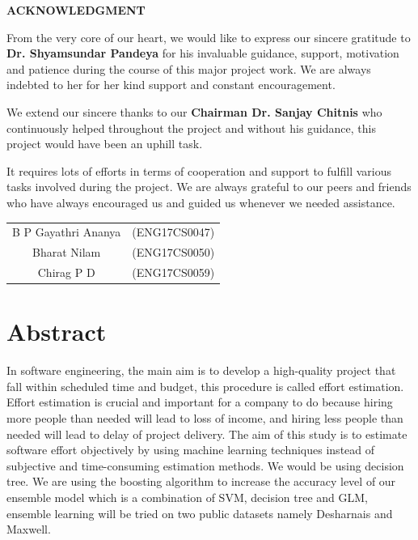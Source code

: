\documentclass[a4paper,12pt]{article}
\begin{document}
\begin{center}
    \large
    \textbf{ACKNOWLEDGMENT}
    
    \vspace{0.7cm}
    \normalsize
    \justify
    From the very core of our heart, we would like to express our sincere gratitude to \textbf{Dr. Shyamsundar Pandeya} for his invaluable guidance, support, motivation and patience during the
course of this major project work. We are always indebted to her for her kind support and constant encouragement.

We extend our sincere thanks to our \textbf{Chairman Dr. Sanjay Chitnis} who continuously helped throughout the project and without his guidance, this project would have been an uphill task. 

It requires lots of efforts in terms of cooperation and support to fulfill various tasks involved
during the project. We are always grateful to our peers and friends who have always encouraged us and guided us whenever we needed assistance.
\end{center}

\vspace{1in}
\begin{flushright}
    \begin{tabular}{c c}
        B P Gayathri Ananya & (ENG17CS0047) \\
        Bharat Nilam & (ENG17CS0050) \\
        Chirag P D & (ENG17CS0059)
    \end{tabular}
\end{flushright}

\pagebreak

\tableofcontents

\pagebreak

\section*{Abstract}
In software engineering, the main aim is to develop a high-quality project that fall within
scheduled time and budget, this procedure is called effort estimation. Effort estimation is
crucial and important for a company to do because hiring more people than needed will lead to
loss of income, and hiring less people than needed will lead to delay of project delivery. The
aim of this study is to estimate software effort objectively by using machine learning techniques
instead of subjective and time-consuming estimation methods. We would be using decision
tree. We are using the boosting algorithm to increase the accuracy level of our ensemble model
which is a combination of SVM, decision tree and GLM, ensemble learning will be tried on
two public datasets namely Desharnais and Maxwell.
\end{document}
